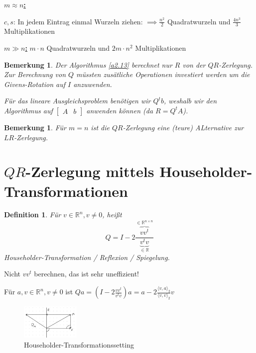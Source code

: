 \documentclass{book}
\newtheorem{definition}[algorithm]{Definition}
\newtheorem{remark}[algorithm]{Bemerkung}
\def\R{\mathbb{R}}
\begin{document}
            \underline{\textbf{$m\approx n$:}}
        
            $c,s$: In jedem Eintrag einmal Wurzeln ziehen: $\implies \frac{n^2}{2}$ Quadratwurzeln und $\frac{4n^3}{3}$ Multiplikationen

            \underline{\textbf{$m\gg n$:}} $m\cdot n$ Quadratwurzeln und $2m\cdot n^2$ Multiplikationen

            \begin{remark}\label{r2.14}
                Der Algorithmus \ref{a2.13} berechnet nur $R$ von der $QR$-Zerlegung. Zur Berechnung von $Q$ müssten 
                zusätliche Operationen investiert werden um die Givens-Rotation auf $I$ anzuwenden.

                Für das lineare Ausgleichsproblem benötigen wir $Q^tb$, weshalb wir den Algorithmus auf $\left[\begin{array}{c|c}
                    A & b
                \end{array}\right]$ anwenden können (da $R=Q^t A$).
            \end{remark}

            \begin{remark}\label{b2.15}
                Für $m=n$ ist die $QR$-Zerlegung eine (teure) ALternative zur $LR$-Zerlegung.
            \end{remark}

        \section{$QR$-Zerlegung mittels Householder-Transformationen}

            \begin{definition}\label{d2.16}
                Für $v\in\R^n,v\neq 0$, heißt \[Q=I-2\frac{\overbrace{vv^t}^{\in\R^{n\times n}}}{\underbrace{v^tv}_{\in\R}}\]
                Householder-Transformation / Reflexion / Spiegelung.
            \end{definition}

            \begin{tcolorbox}[enhanced,breakable,
                title=Wichtig!]
                Nicht $vv^t$ berechnen, das ist sehr uneffizient!
            \end{tcolorbox}

            Für $a,v\in\R^n,v\neq 0$ ist $Qa=\left(I-2\frac{vv^t}{v^tv}\right)a =a-2\frac{\langle v,a \rangle_2}{\langle v,v \rangle_2}v$

            \begin{figure}[H]
                \centering
                \includegraphics[width=0.25\textwidth]{Bild009}
                \caption{Householder-Transformationssetting}
            \end{figure}
\end{document}
